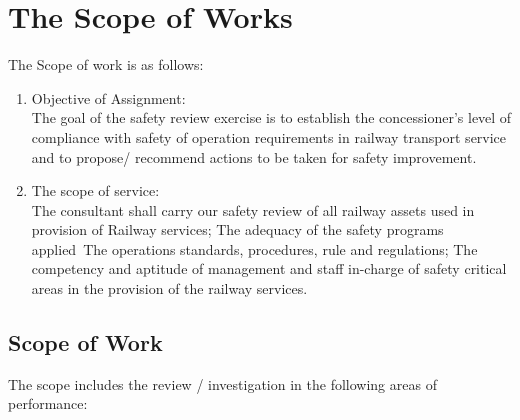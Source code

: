 \section{The Scope of Works}

The Scope of work is as follows:
 
\begin{enumerate}
 	\item   Objective of Assignment:\\
 	The goal of the safety review exercise is to establish the concessioner's level of compliance with safety of operation requirements in railway transport service and to propose/ recommend actions to be taken for safety improvement.
 	\item   The scope of service:\\
 	The consultant shall carry our safety review of all railway assets used in provision of Railway services;
 	The adequacy of the safety programs applied\
 	The operations standards, procedures, rule and regulations; 
 	The competency and aptitude of management and staff in-charge of safety critical areas in the provision of the railway services.
\end{enumerate}
 
 \subsection{Scope of Work}\label{scope-of-work}
 
 The scope includes the review / investigation in the following areas of
 performance:
 
